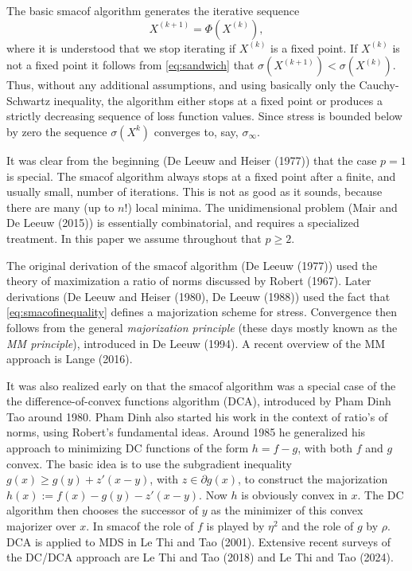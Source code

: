 \documentclass[
  12pt,
]{article}
\begin{document}
The basic smacof algorithm generates the iterative sequence
\begin{equation}
X^{(k+1)}=\Phi(X^{(k)}),
\label{eq:basic}
\end{equation}
where it is understood that we stop iterating if \(X^{(k)}\) is a fixed point. If
\(X^{(k)}\) is not a fixed point it follows from \eqref{eq:sandwich} that \(\sigma(X^{(k+1)})<\sigma(X^{(k)})\). Thus, without any additional
assumptions, and using basically only the Cauchy-Schwartz inequality, the algorithm either stops at a fixed point or produces a strictly decreasing sequence of loss function values. Since stress is bounded below by zero the sequence \(\sigma(X^{k})\) converges to, say, \(\sigma_\infty\).

It was clear from the beginning (De Leeuw and Heiser (1977)) that the case \(p=1\) is special. The
smacof algorithm always stops at a fixed point after a finite, and usually small, number of iterations. This is not as good as it sounds, because there are many (up to \(n!\)) local minima. The unidimensional problem (Mair and De Leeuw (2015)) is essentially combinatorial, and requires a specialized treatment. In this paper we assume throughout that \(p\geq 2\).

The original derivation of the smacof algorithm (De Leeuw (1977))
used the theory of maximization a ratio of norms discussed by Robert (1967). Later
derivations (De Leeuw and Heiser (1980), De Leeuw (1988)) used the fact that \eqref{eq:smacofinequality} defines a majorization scheme for stress. Convergence
then follows from the general \emph{majorization principle} (these days mostly known
as the \emph{MM principle}), introduced in De Leeuw (1994). A recent overview of the MM approach is Lange (2016).

It was also realized early on that the smacof algorithm was a special case of the
the difference-of-convex functions algorithm (DCA), introduced by Pham Dinh Tao around
1980. Pham Dinh also started his work in the context of ratio's of norms, using
Robert's fundamental ideas. Around 1985 he generalized his approach to minimizing
DC functions of the form \(h=f-g\), with both \(f\) and \(g\) convex. The basic idea
is to use the subgradient inequality \(g(x)\geq g(y)+z'(x-y)\), with \(z\in\partial g(x)\),
to construct the majorization \(h(x):=f(x)-g(y)-z'(x-y)\). Now \(h\) is obviously convex in \(x\). The DC algorithm then chooses the successor of \(y\) as the minimizer of this convex majorizer over \(x\). In smacof the role of \(f\) is played by \(\eta^2\) and the role of \(g\) by \(\rho\). DCA is applied to MDS in Le Thi and Tao (2001). Extensive recent surveys of the DC/DCA approach are Le Thi and Tao (2018) and Le Thi and Tao (2024).
\end{document}
